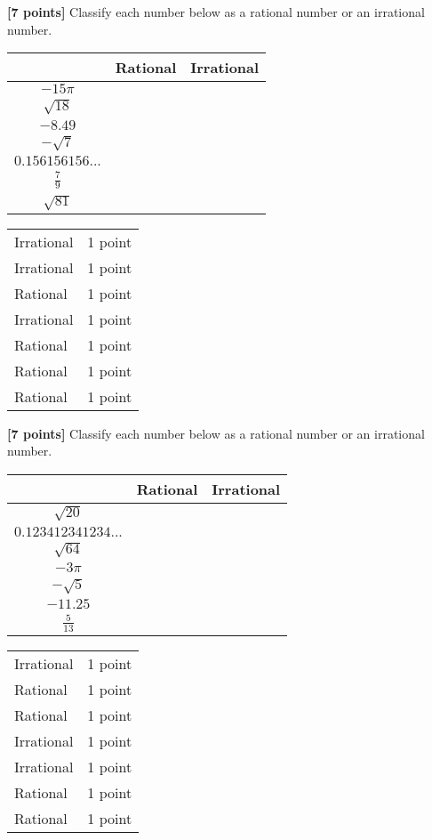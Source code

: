 {
	{\footnotesize\textbf{[7 points]}} Classify each number below as a rational number or an irrational number.
	
	\begin{tabular}{|c|c|c|} 
	\hline
	 & Rational & Irrational\\
	\hline
	$-15\pi$ & & \\
	\hline
	$\sqrt{18}$ & & \\
	\hline
	$-8.49$ & & \\
	\hline
	$-\sqrt{7}$ & & \\
	\hline 
	$0.156156156...$ & & \\
	\hline
	$\frac{7}{9}$ & & \\
	\hline
	$\sqrt{81}$ & & \\
	\hline
	\end{tabular}
}
{
	\begin{tabular}{l r}
	Irrational & 1 point\\
	Irrational & 1 point\\
	Rational & 1 point \\
	Irrational & 1 point\\
	Rational & 1 point \\
	Rational & 1 point \\
	Rational & 1 point \\
	\end{tabular}
}

{
	{\footnotesize\textbf{[7 points]}} Classify each number below as a rational number or an irrational number.
	
	\begin{tabular}{|c|c|c|} 
	\hline
	 & Rational & Irrational\\
	\hline
	$\sqrt{20}$ & & \\
	\hline
	$0.123412341234...$ & & \\
	\hline
	$\sqrt{64}$ & & \\
	\hline
	$-3\pi$ & & \\
	\hline 
	$-\sqrt{5}$ & & \\
	\hline
	$-11.25$ & & \\
	\hline
	$\frac{5}{13}$ & & \\
	\hline
	\end{tabular}
}
{
	\begin{tabular}{l r}
	Irrational & 1 point\\
	Rational & 1 point\\
	Rational & 1 point \\
	Irrational & 1 point\\
	Irrational & 1 point \\
	Rational & 1 point \\
	Rational & 1 point \\
	\end{tabular}
}

